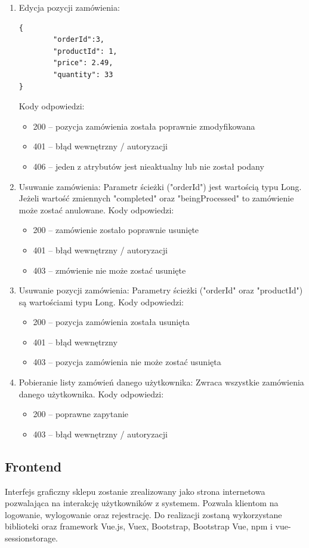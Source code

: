 \documentclass[11pt,a4paper,twoside]{article}
\begin{document}
\begin{enumerate}
\item Edycja pozycji zamówienia:
\begin{lstlisting}
{
        "orderId":3,
        "productId": 1,
        "price": 2.49,
        "quantity": 33
}
\end{lstlisting}
\vspace{-20pt}
Kody odpowiedzi:
\begin{itemize}
\item 200 -- pozycja zamówienia została poprawnie zmodyfikowana
\item 401 -- błąd wewnętrzny / autoryzacji
\item 406 -- jeden z atrybutów jest nieaktualny lub nie został podany
\end{itemize}
\item Usuwanie zamówienia:
Parametr ścieżki ("orderId") jest wartością typu Long. Jeżeli wartość zmiennych "completed" oraz "beingProcessed"  to zamówienie może zostać anulowane.
Kody odpowiedzi:
\begin{itemize}
\item 200 -- zamówienie zostało poprawnie usunięte
\item 401 -- błąd wewnętrzny / autoryzacji
\item 403 -- zmówienie nie może zostać usunięte
\end{itemize}
\item Usuwanie pozycji zamówienia:
Parametry ścieżki ("orderId" oraz "productId") są wartościami typu Long.
Kody odpowiedzi:
\begin{itemize}
\item 200 -- pozycja zamówienia została usunięta
\item 401 -- błąd wewnętrzny
\item 403 -- pozycja zamówienia nie może zostać usunięta
\end{itemize}
\item Pobieranie listy zamówień danego użytkownika:
Zwraca wszystkie zamówienia danego użytkownika.
Kody odpowiedzi:
\begin{itemize}
\item 200 -- poprawne zapytanie
\item 403 -- błąd wewnętrzny / autoryzacji
\end{itemize}
\end{enumerate}


\newpage
\subsection{Frontend}
Interfejs graficzny sklepu zostanie zrealizowany jako strona internetowa pozwalająca na interakcję użytkowników z systemem. Pozwala klientom na logowanie, wylogowanie oraz rejestrację. Do realizacji zostaną wykorzystane biblioteki oraz framework Vue.js, Vuex, Bootstrap, Bootstrap Vue, npm i vue-sessionstorage.
\end{document}
